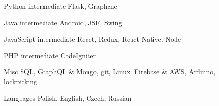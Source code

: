 
\begin{cvskills}

	\cvskill
		{Python}
		{intermediate}
		{Flask, Graphene}

	\cvskill
		{Java}
		{intermediate}
		{Android, JSF, Swing}

	\cvskill
		{JavaScript}
		{intermediate}
		{React, Redux, React Native, Node}

	\cvskill
		{PHP}
		{intermediate}
		{CodeIgniter}

	\cvskill
		{Misc}
		{}
			{SQL, GraphQL \& Mongo, git, Linux, Firebase \& AWS, Arduino, lockpicking}

	\cvskill
		{Languages}
		{}
		{Polish, English, Czech, Russian}

\end{cvskills}
